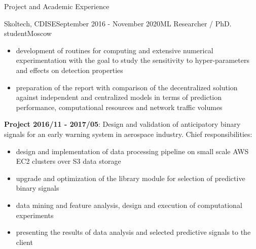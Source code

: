 \documentclass{resume} %
\begin{document}
\begin{rSection}{Project and Academic Experience}
\begin{rSubsection}{Skoltech, CDISE}{September 2016 - November 2020}{ML Researcher / PhD. student}{Moscow}
\begin{itemize}
        \item development of routines for computing and extensive numerical experimentation
        with the goal to study the sensitivity to hyper-parameters and effects on detection
        properties
        
        \item preparation of the report with comparison of the decentralized solution
        against independent and centralized models in terms of prediction performance,
        computational resources and network traffic volumes
    \end{itemize}

    \medskip
    \item \textbf{Project 2016/11 - 2017/05}: 
    Design and validation of anticipatory binary signals for an early warning system
    in aerospace industry.
    Chief responsibilities: \begin{itemize}
        \item design and implementation of data processing pipeline on small scale
        AWS EC2 clusters over S3 data storage
        
        \item upgrade and optimization of the library module for selection of
        predictive binary signals
        
        \item data mining and feature analysis, design and execution of computational
        experiments
        
        \item presenting the results of data analysis and selected predictive signals
        to the client
    \end{itemize}


\end{rSubsection}


\end{rSection}
\end{document}
